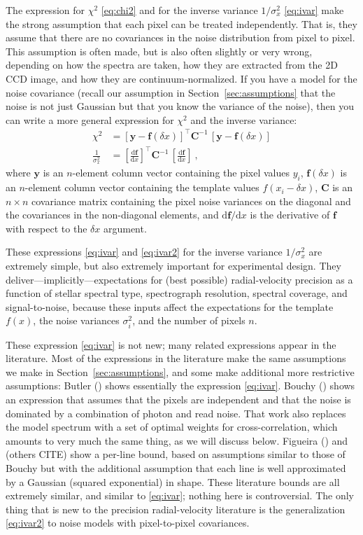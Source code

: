 \documentclass[modern]{aastex631}
\newcommand{\dd}{\mathrm{d}}
\newcommand{\lao}[1]{\boldsymbol{#1}}
\newcommand{\vy}{\lao{y}}
\newcommand{\vf}{\lao{f}}
\newcommand{\vC}{\lao{C}}
\newcommand{\sectionname}{Section}
\newcommand{\secref}[1]{\sectionname~\ref{#1}}
\begin{document}
The expression for $\chi^2$ \eqref{eq:chi2} and for the inverse variance $1/\sigma_x^2$ \eqref{eq:ivar} make the strong assumption that each pixel can be treated independently.
That is, they assume that there are no covariances in the noise distribution from pixel to pixel.
This assumption is often made, but is also often slightly or very wrong, depending on how the spectra are taken, how they are extracted from the 2D CCD image, and how they are continuum-normalized.
If you have a model for the noise covariance (recall our assumption in \secref{sec:assumptions} that the noise is not just Gaussian but that you know the variance of the noise), then you can write a more general expression for $\chi^2$ and the inverse variance:
\begin{align}
    \chi^2 &= [\vy - \vf(\delta x)]^\top\vC^{-1}\,[\vy - \vf(\delta x)]\\
    \frac{1}{\sigma_x^2} &= \left[\frac{\dd\vf}{\dd x}\right]^\top\vC^{-1}\,\left[\frac{\dd\vf}{\dd x}\right]\label{eq:ivar2} ~,
\end{align}
where $\vy$ is an $n$-element column vector containing the pixel values $y_i$,
$\vf(\delta x)$ is an $n$-element column vector containing the template values $f(x_i-\delta x)$,
$\vC$ is an $n\times n$ covariance matrix containing the pixel noise variances on the diagonal and the covariances in the non-diagonal elements,
and $\dd\vf/\dd x$ is the derivative of $\vf$ with respect to the $\delta x$ argument.

These expressions \eqref{eq:ivar} and \eqref{eq:ivar2} for the inverse variance $1/\sigma_x^2$ are extremely simple, but also extremely important for experimental design.
They deliver---implicitly---expectations for (best possible) radial-velocity precision as a function of stellar spectral type, spectrograph resolution, spectral coverage, and signal-to-noise, because these inputs affect the expectations for the template $f(x)$, the noise variances $\sigma_i^2$, and the number of pixels $n$.

These expression \eqref{eq:ivar} is not new; many related expressions appear in the literature.
Most of the expressions in the literature make the same assumptions we make in \secref{sec:assumptions}, and some make additional more restrictive assumptions:
Butler (\citealt{Butler}) shows essentially the expression \eqref{eq:ivar}.
Bouchy (\citealt{Bouchy}) shows an expression that assumes that the pixels are independent and that the noise is dominated by a combination of photon and read noise. 
That work also replaces the model spectrum with a set of optimal weights for cross-correlation, which amounts to very much the same thing, as we will discuss below.
Figueira (\citealt{figuera}) and (others CITE) show a per-line bound, based on assumptions similar to those of Bouchy but with the additional assumption that each line is well approximated by a Gaussian (squared exponential) in shape.
These literature bounds are all extremely similar, and similar to \eqref{eq:ivar}; nothing here is controversial.
The only thing that is new to the precision radial-velocity literature is the generalization \eqref{eq:ivar2} to noise models with pixel-to-pixel covariances.
\end{document}
